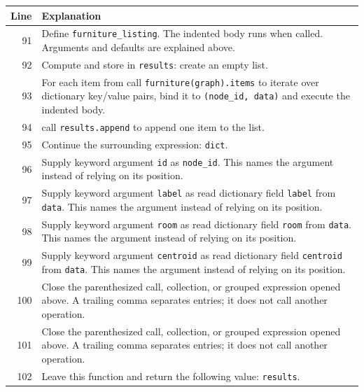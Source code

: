 \documentclass[11pt,a4paper]{book}
\begin{document}
\begin{longtable}{r p{}}

\textbf{Line} & \textbf{Explanation} \\ \hline \endhead

91 & Define \texttt{furniture\_listing}. The indented body runs when called. Arguments and defaults are explained above. \\

92 & Compute and store in \texttt{results}: create an empty list.  \\

93 & For each item from call \texttt{furniture(graph).items} to iterate over dictionary key/value pairs, bind it to \texttt{(node\_id, data)} and execute the indented body. \\

94 & call \texttt{results.append} to append one item to the list. \\

95 & Continue the surrounding expression: \texttt{dict}. \\

96 & Supply keyword argument \texttt{id} as \texttt{node\_id}. This names the argument instead of relying on its position. \\

97 & Supply keyword argument \texttt{label} as read dictionary field \texttt{label} from \texttt{data}. This names the argument instead of relying on its position. \\

98 & Supply keyword argument \texttt{room} as read dictionary field \texttt{room} from \texttt{data}. This names the argument instead of relying on its position. \\

99 & Supply keyword argument \texttt{centroid} as read dictionary field \texttt{centroid} from \texttt{data}. This names the argument instead of relying on its position. \\

100 & Close the parenthesized call, collection, or grouped expression opened above. A trailing comma separates entries; it does not call another operation. \\

101 & Close the parenthesized call, collection, or grouped expression opened above. A trailing comma separates entries; it does not call another operation. \\

102 & Leave this function and return the following value: \texttt{results}. \\

\end{longtable}
\end{document}
